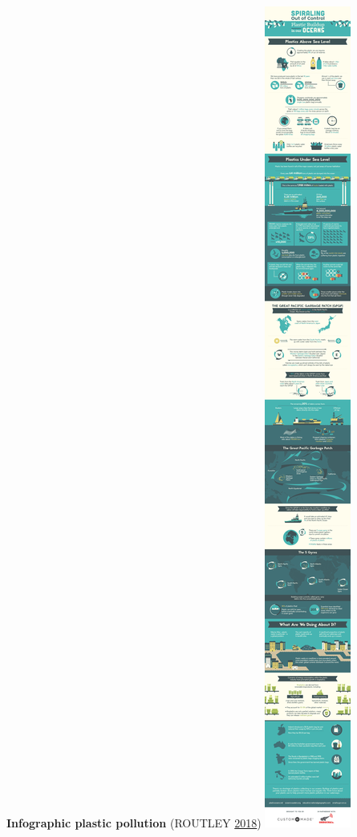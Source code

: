 \documentclass[]{book}
\theoremstyle{definition}
\theoremstyle{definition}
\theoremstyle{definition}
\theoremstyle{remark}
\begin{document}
\textbf{Infographic plastic pollution} (ROUTLEY
\protect\hyperlink{ref-plastic_pollution_infographics}{2018})
\includegraphics{images/infographic-plastic-buildup.jpg}
\end{document}
